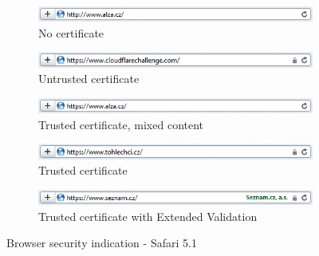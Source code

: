 \begin{figure}
  \begin{subfigure}[b]{\textwidth}
    \centering
    \includegraphics[scale=0.6]{images/browsers/s-none.png}
    \caption{No certificate}
  \end{subfigure}
  \begin{subfigure}[b]{\textwidth}
    \centering
    \includegraphics[scale=0.6]{images/browsers/s-untrusted.png}
    \caption{Untrusted certificate}
  \end{subfigure}
  \begin{subfigure}[b]{\textwidth}
    \centering
    \includegraphics[scale=0.6]{images/browsers/s-mixed.png}
    \caption{Trusted certificate, mixed content}
  \end{subfigure}
  \begin{subfigure}[b]{\textwidth}
    \centering
    \includegraphics[scale=0.6]{images/browsers/s-dv.png}
    \caption{Trusted certificate}
  \end{subfigure}
  \begin{subfigure}[b]{\textwidth}
    \centering
    \includegraphics[scale=0.6]{images/browsers/s-ev.png}
    \caption{Trusted certificate with Extended Validation}
  \end{subfigure}
  \caption{Browser security indication - Safari 5.1}
\end{figure}
